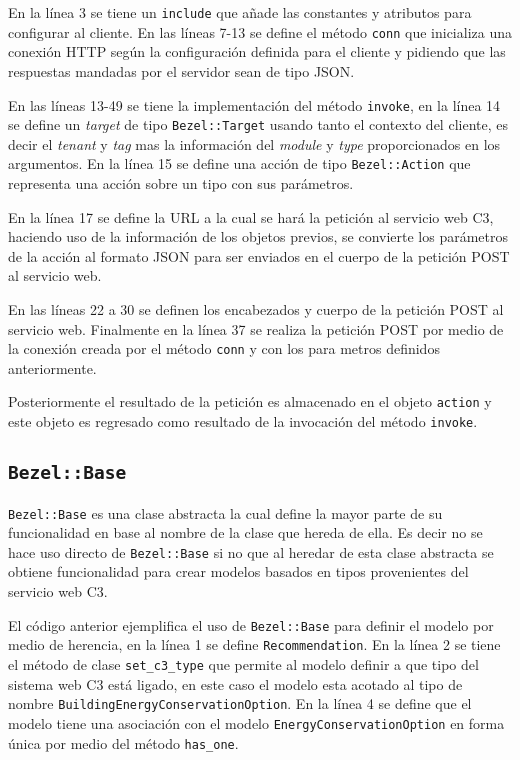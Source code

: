 En la línea 3 se tiene un \texttt{include} que añade las constantes
y atributos para configurar al cliente. En las líneas 7-13 se define el método
\texttt{conn} que inicializa una conexión HTTP según la configuración definida
para el cliente y pidiendo que las respuestas mandadas por el servidor
sean de tipo JSON.

En las líneas 13-49 se tiene la implementación del método \texttt{invoke}, en
la línea 14 se define un \textit{target} de tipo \texttt{Bezel::Target} usando
tanto el contexto del cliente, es decir el \textit{tenant} y \textit{tag} mas
la información del \textit{module} y \textit{type} proporcionados en los argumentos.
En la línea 15 se define una acción de tipo \texttt{Bezel::Action} que representa
una acción sobre un tipo con sus parámetros.

En la línea 17 se define la URL a la cual se hará la petición al servicio web C3,
haciendo uso de la información de los objetos previos, se convierte los parámetros
de la acción al formato JSON para ser enviados en el cuerpo de la petición POST
al servicio web.


En las líneas 22 a 30 se definen los encabezados y cuerpo de la petición POST al
servicio web. Finalmente en la línea 37 se realiza la petición POST por medio
de la conexión creada por el método \texttt{conn} y con los para metros definidos
anteriormente.

Posteriormente el resultado de la petición es almacenado en el objeto \texttt{action}
y este objeto es regresado como resultado de la invocación del método
\texttt{invoke}.

\subsection{\texttt{Bezel::Base}}

\texttt{Bezel::Base} es una clase abstracta la cual define la mayor parte de su
funcionalidad en base al nombre de la clase que hereda de ella. Es decir no se hace
uso directo de \texttt{Bezel::Base} si no que al heredar de esta clase abstracta
se obtiene funcionalidad para crear modelos basados en tipos provenientes
del servicio web C3.



El código anterior ejemplifica el uso de \texttt{Bezel::Base} para definir el modelo
por medio de herencia, en la línea 1 se define \texttt{Recommendation}. En la línea 2
se tiene el método de clase \texttt{set\_c3\_type} que permite al modelo definir
a que tipo del sistema web C3 está ligado, en este caso el modelo esta acotado al
tipo de nombre \texttt{BuildingEnergyConservationOption}. En la línea 4 se define
que el modelo tiene una asociación con el modelo \texttt{EnergyConservationOption}
en forma única por medio del método \texttt{has\_one}.

